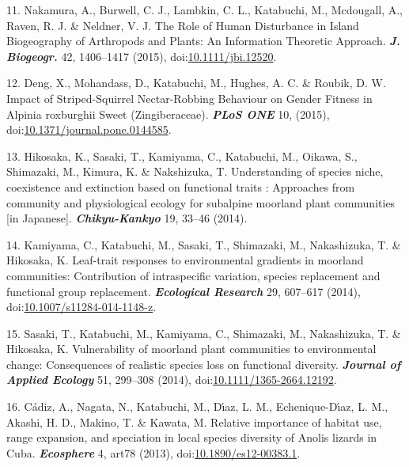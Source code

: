 \documentclass[
]{article}
\newenvironment{cslreferences}%
  {}%
  {\par}
\begin{document}
\begin{cslreferences}
\leavevmode\hypertarget{ref-Nakamura2015}{}%
11. Nakamura, A., Burwell, C. J., Lambkin, C. L., Katabuchi, M.,
Mcdougall, A., Raven, R. J. \& Neldner, V. J. The Role of Human
Disturbance in Island Biogeography of Arthropods and Plants: An
Information Theoretic Approach. \emph{\textbf{J. Biogeogr.}} 42,
1406--1417 (2015),
doi:\href{https://doi.org/10.1111/jbi.12520}{10.1111/jbi.12520}.

\leavevmode\hypertarget{ref-Deng2015}{}%
12. Deng, X., Mohandass, D., Katabuchi, M., Hughes, A. C. \& Roubik, D.
W. Impact of Striped-Squirrel Nectar-Robbing Behaviour on Gender Fitness
in Alpinia roxburghii Sweet (Zingiberaceae). \emph{\textbf{PLoS ONE}}
10, (2015),
doi:\href{https://doi.org/10.1371/journal.pone.0144585}{10.1371/journal.pone.0144585}.

\leavevmode\hypertarget{ref-Hikosaka2014}{}%
13. Hikosaka, K., Sasaki, T., Kamiyama, C., Katabuchi, M., Oikawa, S.,
Shimazaki, M., Kimura, K. \& Nakshizuka, T. Understanding of species
niche, coexistence and extinction based on functional traits :
Approaches from community and physiological ecology for subalpine
moorland plant communities {[}in Japanese{]}.
\emph{\textbf{Chikyu-Kankyo}} 19, 33--46 (2014).

\leavevmode\hypertarget{ref-Kamiyama2014}{}%
14. Kamiyama, C., Katabuchi, M., Sasaki, T., Shimazaki, M., Nakashizuka,
T. \& Hikosaka, K. Leaf-trait responses to environmental gradients in
moorland communities: Contribution of intraspecific variation, species
replacement and functional group replacement. \emph{\textbf{Ecological
Research}} 29, 607--617 (2014),
doi:\href{https://doi.org/10.1007/s11284-014-1148-z}{10.1007/s11284-014-1148-z}.

\leavevmode\hypertarget{ref-Sasaki2014}{}%
15. Sasaki, T., Katabuchi, M., Kamiyama, C., Shimazaki, M., Nakashizuka,
T. \& Hikosaka, K. Vulnerability of moorland plant communities to
environmental change: Consequences of realistic species loss on
functional diversity. \emph{\textbf{Journal of Applied Ecology}} 51,
299--308 (2014),
doi:\href{https://doi.org/10.1111/1365-2664.12192}{10.1111/1365-2664.12192}.

\leavevmode\hypertarget{ref-Cdiz2013}{}%
16. Cádiz, A., Nagata, N., Katabuchi, M., Dı́az, L. M., Echenique-Dı́az,
L. M., Akashi, H. D., Makino, T. \& Kawata, M. Relative importance of
habitat use, range expansion, and speciation in local species diversity
of Anolis lizards in Cuba. \emph{\textbf{Ecosphere}} 4, art78 (2013),
doi:\href{https://doi.org/10.1890/es12-00383.1}{10.1890/es12-00383.1}.


\end{cslreferences}
\end{document}
